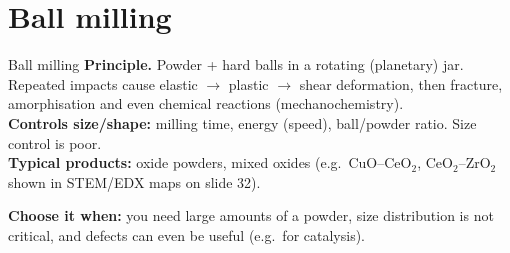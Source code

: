 \section{Ball milling}
\begin{cardbox}{Ball milling }
\textbf{Principle.} Powder + hard balls in a rotating (planetary) jar. Repeated impacts cause elastic $\to$ plastic
$\to$ shear deformation, then fracture, amorphisation and even chemical reactions (mechanochemistry).\\
\textbf{Controls size/shape:} milling time, energy (speed), ball/powder ratio. Size control is poor.\\
\textbf{Typical products:} oxide powders, mixed oxides (e.g.\ CuO--CeO$_2$, CeO$_2$--ZrO$_2$ shown in
STEM/EDX maps on slide 32).
\end{cardbox}
\textbf{Choose it when:} you need large amounts of a powder, size distribution is not critical, and defects
can even be useful (e.g.\ for catalysis).

